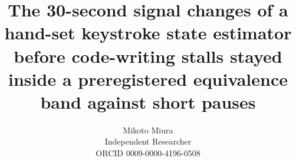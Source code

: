 \documentclass[notitlepage,12pt]{jedm}
\begin{document}
\title{The 30-second signal changes of a hand-set keystroke state estimator before code-writing stalls stayed inside a
preregistered equivalence band against short pauses}
\date{}
\author{{\large Mikoto Miura}\\Independent Researcher\\ORCID 0009-0000-4196-0508}

\maketitle

















\appendix

\end{document}
